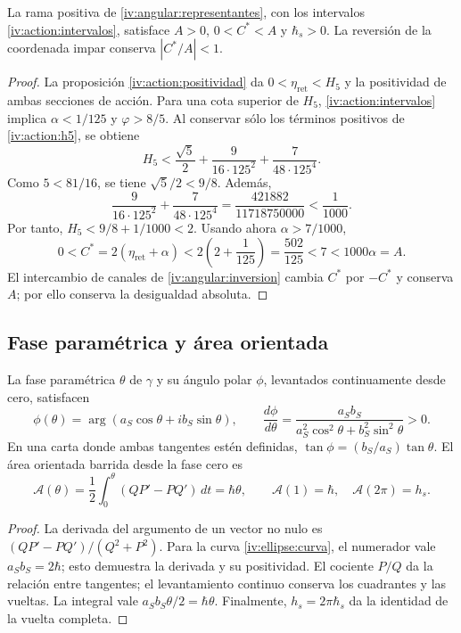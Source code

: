 \begin{proposition}
\label{iv:ellipse:pertenencia}
La rama positiva de \eqref{iv:angular:representantes}, con los
intervalos \eqref{iv:action:intervalos}, satisface
\(A>0\), \(0<C^*<A\) y \(\hbar_s>0\).
La reversión de la coordenada impar conserva \(|C^*/A|<1\).
\end{proposition}
\begin{proof}
La proposición \ref{iv:action:positividad} da
\(0<\eta_{\mathrm{ret}}<H_5\) y la positividad de ambas
secciones de acción. Para una cota superior de \(H_5\),
\eqref{iv:action:intervalos} implica
\(\alpha<1/125\) y \(\varphi>8/5\). Al conservar sólo
los términos positivos de \eqref{iv:action:h5}, se obtiene
\[
 H_5<
 \frac{\sqrt5}{2}+
 \frac{9}{16\cdot125^2}+
 \frac{7}{48\cdot125^4}.
\]
Como \(5<81/16\), se tiene \(\sqrt5/2<9/8\). Además,
\[
 \frac{9}{16\cdot125^2}+
 \frac{7}{48\cdot125^4}
 =\frac{421882}{11718750000}<\frac1{1000}.
\]
Por tanto, \(H_5<9/8+1/1000<2\). Usando ahora
\(\alpha>7/1000\),
\[
 0<C^*=2(\eta_{\mathrm{ret}}+\alpha)
 <2\left(2+\frac1{125}\right)=\frac{502}{125}
 <7<1000\alpha=A.
\]
El intercambio de canales de
\ref{iv:angular:inversion} cambia \(C^*\) por \(-C^*\)
y conserva \(A\); por ello conserva la desigualdad absoluta.
\end{proof}

\subsection{Fase paramétrica y área orientada}
\label{iv:ellipse:area}

\begin{proposition}
\label{iv:ellipse:ley-areal}
La fase paramétrica \(\theta\) de \(\gamma\) y su ángulo
polar \(\phi\), levantados continuamente desde cero, satisfacen
\begin{equation}
 \phi(\theta)=\arg(a_S\cos\theta+i b_S\sin\theta),\qquad
 \frac{d\phi}{d\theta}
 =\frac{a_Sb_S}{a_S^2\cos^2\theta+b_S^2\sin^2\theta}>0.
 \label{iv:ellipse:fases}
\end{equation}
En una carta donde ambas tangentes estén definidas,
\(\tan\phi=(b_S/a_S)\tan\theta\). El área orientada barrida
desde la fase cero es
\begin{equation}
 \mathcal A(\theta)=
 \frac12\int_0^\theta(QP'-PQ')\,dt=\hbar\theta,
 \qquad
 \mathcal A(1)=\hbar,\quad\mathcal A(2\pi)=h_s.
 \label{iv:ellipse:area-fase}
\end{equation}
\end{proposition}
\begin{proof}
La derivada del argumento de un vector no nulo es
\((QP'-PQ')/(Q^2+P^2)\). Para la curva
\eqref{iv:ellipse:curva}, el numerador vale
\(a_Sb_S=2\hbar\); esto demuestra la derivada y su
positividad. El cociente \(P/Q\) da la relación entre tangentes;
el levantamiento continuo conserva los cuadrantes y las vueltas.
La integral vale \(a_Sb_S\theta/2=\hbar\theta\).
Finalmente, \(h_s=2\pi\hbar_s\) da la identidad de la
vuelta completa.
\end{proof}

